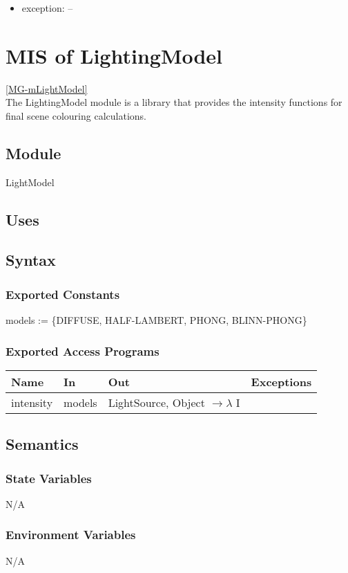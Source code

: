 \documentclass[12pt, titlepage]{article}
\begin{document}
\begin{itemize}
	\item exception: -- \\
\end{itemize}

\section{MIS of LightingModel} \ref{MG-mLightModel} \\
The LightingModel module is a library that provides the intensity functions for 
final scene colouring calculations.
\subsection{Module}
LightModel

\subsection{Uses}

\subsection{Syntax}
\subsubsection{Exported Constants}
models := \{DIFFUSE, HALF-LAMBERT, PHONG, BLINN-PHONG\}
\subsubsection{Exported Access Programs}
\begin{center}
	\begin{tabular}{p{3cm} p{4cm} p{2cm} p{4cm}}
		\hline
		\textbf{Name} & \textbf{In} & \textbf{Out} & \textbf{Exceptions} \\
		\hline
		intensity & models & LightSource, Object $\to \lambda$ I & \\
		\hline
	\end{tabular}
\end{center}

\subsection{Semantics}
\subsubsection{State Variables}
N/A
\subsubsection{Environment Variables}
N/A
\end{document}
